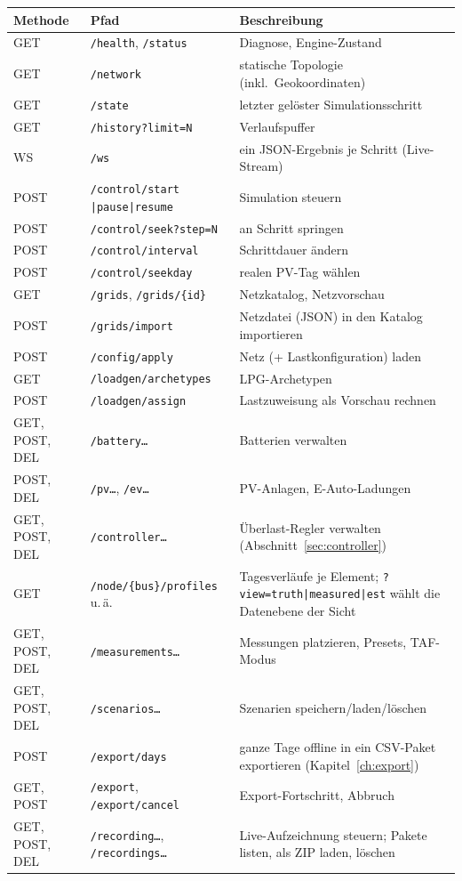 \documentclass[11pt,a4paper,parskip=half]{scrreprt}
\newcommand{\api}[1]{\texttt{#1}}                    %
\begin{document}
{\small
\begin{longtable}{@{}p{}p{}p{}@{}}
\toprule
Methode & Pfad & Beschreibung \\
\midrule
\endhead
GET & \api{/health}, \api{/status} & Diagnose, Engine-Zustand \\
GET & \api{/network} & statische Topologie (inkl.\ Geokoordinaten) \\
GET & \api{/state} & letzter gelöster Simulationsschritt \\
GET & \api{/history?limit=N} & Verlaufspuffer \\
WS & \api{/ws} & ein JSON-Ergebnis je Schritt (Live-Stream) \\
POST & \api{/control/start} \api{|pause|resume} & Simulation steuern \\
POST & \api{/control/seek?step=N} & an Schritt springen \\
POST & \api{/control/interval} & Schrittdauer ändern \\
POST & \api{/control/seekday} & realen PV-Tag wählen \\
GET & \api{/grids}, \api{/grids/\{id\}} & Netzkatalog, Netzvorschau \\
POST & \api{/grids/import} & Netzdatei (JSON) in den Katalog importieren \\
POST & \api{/config/apply} & Netz (+ Lastkonfiguration) laden \\
GET & \api{/loadgen/archetypes} & LPG-Archetypen \\
POST & \api{/loadgen/assign} & Lastzuweisung als Vorschau rechnen \\
GET, POST, DEL & \api{/battery\ldots} & Batterien verwalten \\
POST, DEL & \api{/pv\ldots}, \api{/ev\ldots} & PV-Anlagen, E-Auto-Ladungen \\
GET, POST, DEL & \api{/controller\ldots} & Überlast-Regler verwalten (Abschnitt~\ref{sec:controller}) \\
GET & \api{/node/\{bus\}/profiles} u.\,ä. & Tagesverläufe je Element; \api{?view=truth|measured|est} wählt die Datenebene der Sicht \\
GET, POST, DEL & \api{/measurements\ldots} & Messungen platzieren, Presets, TAF-Modus \\
GET, POST, DEL & \api{/scenarios\ldots} & Szenarien speichern/laden/löschen \\
POST & \api{/export/days} & ganze Tage offline in ein CSV-Paket exportieren (Kapitel~\ref{ch:export}) \\
GET, POST & \api{/export}, \api{/export/cancel} & Export-Fortschritt, Abbruch \\
GET, POST, DEL & \api{/recording\ldots}, \api{/recordings\ldots} & Live-Aufzeichnung steuern; Pakete listen, als ZIP laden, löschen \\
\bottomrule
\end{longtable}
}
\end{document}
